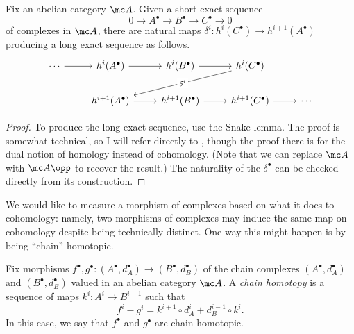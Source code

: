 \documentclass[../notes.tex]{subfiles}
\begin{document}
\begin{proposition}
	Fix an abelian category $\mc A$. Given a short exact sequence
	\[0\to A^\bullet\to B^\bullet\to C^\bullet\to0\]
	of complexes in $\mc A$, there are natural maps $\delta^i\colon h^i(C^\bullet)\to h^{i+1}(A^\bullet)$ producing a long exact sequence as follows.
	\[\begin{tikzcd}
		\cdots & {h^i(A^\bullet)} & {h^i(B^\bullet)} & {h^i(C^\bullet)} \\
		& {h^{i+1}(A^\bullet)} & {h^{i+1}(B^\bullet)} & {h^{i+1}(C^\bullet)} & \cdots
		\arrow[from=1-1, to=1-2]
		\arrow[from=1-2, to=1-3]
		\arrow[from=1-3, to=1-4]
		\arrow["{\delta^i}"{description}, from=1-4, to=2-2]
		\arrow[from=2-2, to=2-3]
		\arrow[from=2-3, to=2-4]
		\arrow[from=2-4, to=2-5]
	\end{tikzcd}\]
\end{proposition}
\begin{proof}
	To produce the long exact sequence, use the Snake lemma. The proof is somewhat technical, so I will refer directly to \cite[Theorem~4.82]{elber-ca}, though the proof there is for the dual notion of homology instead of cohomology. (Note that we can replace $\mc A$ with $\mc A\opp$ to recover the result.) The naturality of the $\delta^\bullet$ can be checked directly from its construction.
\end{proof}
We would like to measure a morphism of complexes based on what it does to cohomology: namely, two morphisms of complexes may induce the same map on cohomology despite being technically distinct. One way this might happen is by being ``chain'' homotopic.
\begin{definition}
	Fix morphisms $f^\bullet,g^\bullet\colon(A^\bullet,d_A^\bullet)\to(B^\bullet,d_B^\bullet)$ of the chain complexes $(A^\bullet,d_A^\bullet)$ and $(B^\bullet,d_B^\bullet)$ valued in an abelian category $\mc A$. A \textit{chain homotopy} is a sequence of maps $k^i\colon A^i\to B^{i-1}$ such that
	\[f^i-g^i=k^{i+1}\circ d_A^i+d_B^{i-1}\circ k^i.\]
	In this case, we say that $f^\bullet$ and $g^\bullet$ are chain homotopic.
\end{definition}
\end{document}
